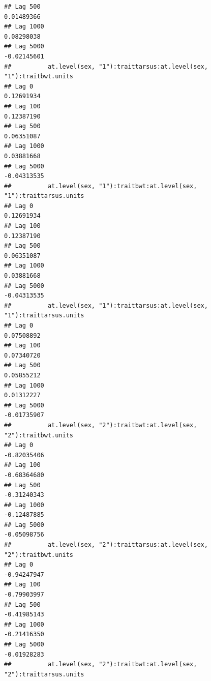 \documentclass[
  12pt,
]{book}
\begin{document}
\begin{verbatim}
## Lag 500                                                     0.01489366
## Lag 1000                                                    0.08298038
## Lag 5000                                                   -0.02145601
##          at.level(sex, "1"):traittarsus:at.level(sex, "1"):traitbwt.units
## Lag 0                                                          0.12691934
## Lag 100                                                        0.12387190
## Lag 500                                                        0.06351087
## Lag 1000                                                       0.03881668
## Lag 5000                                                      -0.04313535
##          at.level(sex, "1"):traitbwt:at.level(sex, "1"):traittarsus.units
## Lag 0                                                          0.12691934
## Lag 100                                                        0.12387190
## Lag 500                                                        0.06351087
## Lag 1000                                                       0.03881668
## Lag 5000                                                      -0.04313535
##          at.level(sex, "1"):traittarsus:at.level(sex, "1"):traittarsus.units
## Lag 0                                                             0.07508892
## Lag 100                                                           0.07340720
## Lag 500                                                           0.05855212
## Lag 1000                                                          0.01312227
## Lag 5000                                                         -0.01735907
##          at.level(sex, "2"):traitbwt:at.level(sex, "2"):traitbwt.units
## Lag 0                                                      -0.82035406
## Lag 100                                                    -0.68364680
## Lag 500                                                    -0.31240343
## Lag 1000                                                   -0.12487885
## Lag 5000                                                   -0.05098756
##          at.level(sex, "2"):traittarsus:at.level(sex, "2"):traitbwt.units
## Lag 0                                                         -0.94247947
## Lag 100                                                       -0.79903997
## Lag 500                                                       -0.41985143
## Lag 1000                                                      -0.21416350
## Lag 5000                                                      -0.01928283
##          at.level(sex, "2"):traitbwt:at.level(sex, "2"):traittarsus.units

\end{verbatim}
\end{document}
